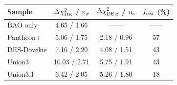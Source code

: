 \begin{tabular}{lccc}
\hline\hline
Sample & $\Delta\chi^2_{\rm DE}$ / $n_\sigma$ & $\Delta\chi^2_{{\rm DE}|\varepsilon}$ / $n_\sigma$ & $f_{\rm red}$ (\%) \\
\hline
BAO only & 4.65 / 1.66 & ------ & ------ \\
\hline
Pantheon+ & 5.06 / 1.75 & 2.18 / 0.96 & 57 \\
DES-Dovekie & 7.16 / 2.20 & 4.08 / 1.51 & 43 \\
Union3 & 10.03 / 2.71 & 5.75 / 1.91 & 43 \\
Union3.1 & 6.42 / 2.05 & 5.26 / 1.80 & 18 \\
\hline\hline
\end{tabular}
